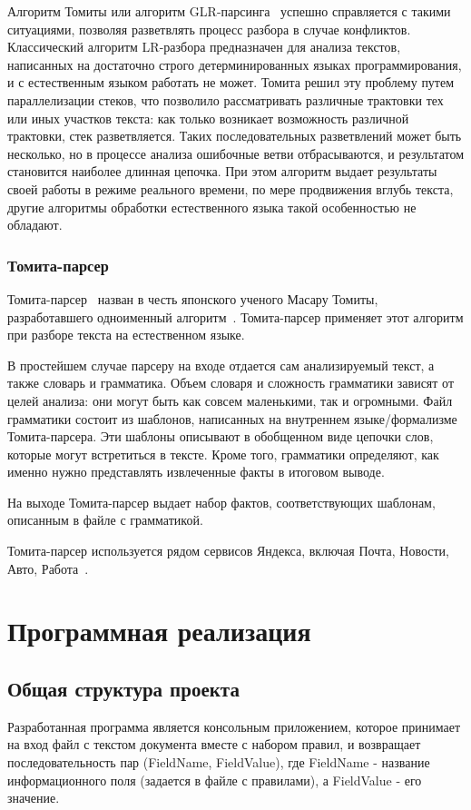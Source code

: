 Алгоритм Томиты или алгоритм GLR-парсинга~\autocite{tomita-algorithm} успешно справляется с такими ситуациями, позволяя разветвлять процесс разбора в случае конфликтов. Классический алгоритм LR-разбора предназначен для анализа текстов, написанных на достаточно строго детерминированных языках программирования, и с естественным языком работать не может. Томита решил эту проблему путем параллелизации стеков, что позволило рассматривать различные трактовки тех или иных участков текста: как только возникает возможность различной трактовки, стек разветвляется. Таких последовательных разветвлений может быть несколько, но в процессе анализа ошибочные ветви отбрасываются, и результатом становится наиболее длинная цепочка. При этом алгоритм выдает результаты своей работы в режиме реального времени, по мере продвижения вглубь текста, другие алгоритмы обработки естественного языка такой особенностью не обладают.

\subsection{Томита-парсер}
Томита-парсер~\autocite{tomita-parser} назван в честь японского ученого Масару Томиты, разработавшего одноименный алгоритм~\autocite{tomita-habr}. Томита-парсер применяет этот алгоритм при разборе текста на естественном языке.

В простейшем случае парсеру на входе отдается сам анализируемый текст, а также словарь и грамматика. Объем словаря и сложность грамматики зависят от целей анализа: они могут быть как совсем маленькими, так и огромными. Файл грамматики состоит из шаблонов, написанных на внутреннем языке/формализме Томита-парсера. Эти шаблоны описывают в обобщенном виде цепочки слов, которые могут встретиться в тексте. Кроме того, грамматики определяют, как именно нужно представлять извлеченные факты в итоговом выводе.

На выходе Томита-парсер выдает набор фактов, соответствующих шаблонам, описанным в файле с грамматикой.

Томита-парсер используется рядом сервисов Яндекса, включая Почта, Новости, Авто, Работа~\autocite{tomita-habr}.

\chapter{Программная реализация}
\section{Общая структура проекта}
Разработанная программа является консольным приложением, которое принимает на вход файл с текстом документа вместе с набором правил, и возвращает последовательность пар (FieldName, FieldValue), где FieldName - название информационного поля (задается в файле с правилами), а FieldValue - его значение.

